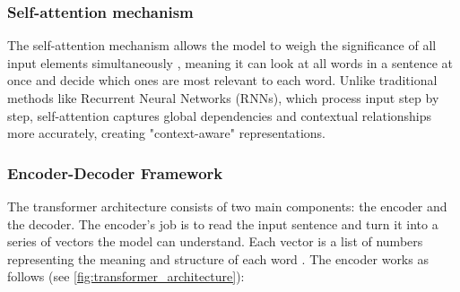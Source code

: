     \subsubsection{Self-attention mechanism}
    The self-attention mechanism allows the model to weigh the significance of all input elements simultaneously \parencite{xiaoIntroductionTransformersNLP2023}, meaning it can look at all words in a sentence at once and decide which ones are most relevant to each word. Unlike traditional methods like Recurrent Neural Networks (RNNs), which process input step by step, self-attention captures global dependencies and contextual relationships more accurately, creating "context-aware" representations.

    \subsubsection{Encoder-Decoder Framework} \label{subsection:encoder-decoder}
    The transformer architecture consists of two main components: the encoder and the decoder. The encoder’s job is to read the input sentence and turn it into a series of vectors the model can understand. Each vector is a list of numbers representing the meaning and structure of each word \parencite{xiaoIntroductionTransformersNLP2023}. The encoder works as follows (see \autoref{fig:transformer_architecture}):

